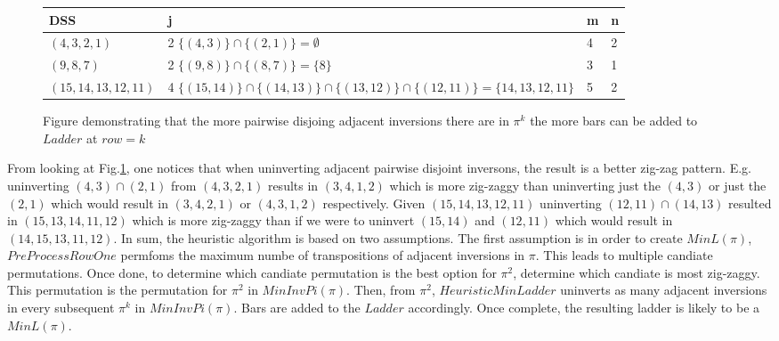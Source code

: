 \begin{figure}
    \begin{tabular}{|p{3cm}||p{7cm}||p{1cm}||p{1cm}|}
        \hline 
    DSS & j & m & n \\ 
    \hline
    \small{$(4,3,2,1)$} & 2 $\{(4,3)\} \cap \{(2,1)\} = \emptyset$ & 4 & 2\\
    \hline 
    \small{$(9,8,7)$} & 2 $\{(9,8)\} \cap \{(8,7)\} = \{8\}$ & 3 & 1\\
    \hline 
     \small{$(15,14,13,12,11)$} & 4 $\{(15,14)\} \cap \{(14,13)\} \cap \{(13,12)\} \cap \{(12,11)\} = \{14,13,12,11\}$ & 5 & 2\\
     \hline
    \end{tabular}
    \caption{Figure demonstrating that the more pairwise disjoing adjacent inversions there are in $\pi^{k}$ the more bars can 
    be added to $Ladder$ at $row=k$}
    \label{Fig:PairwiseDisjoint}
\end{figure}


From looking at Fig.\ref{Fig:PairwiseDisjoint}, one notices that when uninverting adjacent pairwise disjoint inversons, 
the result is a better zig-zag pattern. E.g. uninverting $(4,3) \cap (2,1)$ from $(4,3,2,1)$ results in $(3,4,1,2)$
which is more zig-zaggy than uninverting just the $(4,3)$ or just the $(2,1)$ which would result in $(3,4,2,1)$ or 
$(4,3,1,2)$ respectively. Given $(15,14,13,12,11)$ uninverting $(12,11) \cap 
(14,13)$ resulted in $(15,13,14,11,12)$ which is more zig-zaggy 
than if we were to uninvert $(15,14)$ and $(12,11)$ which would result in $(14,15,13,11,12)$.
In sum, the heuristic algorithm is based on two assumptions. The first assumption is in order 
to create $MinL(\pi)$, $PreProcessRowOne$ permfoms the maximum numbe of transpositions 
of adjacent inversions in $\pi$. This leads to multiple candiate permutations.
 Once done, to determine which candiate permutation is the best option 
for $\pi^{2}$, determine which candiate is most zig-zaggy. 
This permutation is the permutation for $\pi^{2}$ in $MinInvPi(\pi)$. Then, from $\pi^{2}$, $HeuristicMinLadder$ 
uninverts as many adjacent inversions in every subsequent $\pi^{k}$ in $MinInvPi(\pi)$. Bars 
are added to the $Ladder$ accordingly. Once complete, the resulting ladder is likely to be a $MinL(\pi)$.






 